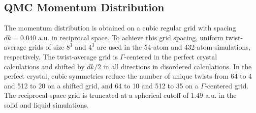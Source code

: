 \documentclass[aps,prl,superscriptaddress]{revtex4-1}
\begin{document}
\subsection{QMC Momentum Distribution}

The momentum distribution is obtained on a cubic regular grid with spacing $dk=0.040$ a.u. in reciprocal space. To achieve this grid spacing, uniform twist-average grids of size $8^3$ and $4^3$ are used in the 54-atom and 432-atom simulations, respectively. The twist-average grid is $\Gamma$-centered in the perfect crystal calculations and shifted by $dk/2$ in all directions in disordered calculations. In the perfect crystal, cubic symmetries reduce the number of unique twists from 64 to 4 and 512 to 20 on a shifted grid, and 64 to 10 and 512 to 35 on a $\Gamma$-centered grid. The reciprocal-space grid is truncated at a spherical cutoff of $1.49$ a.u. in the solid and liquid simulations.
\end{document}

